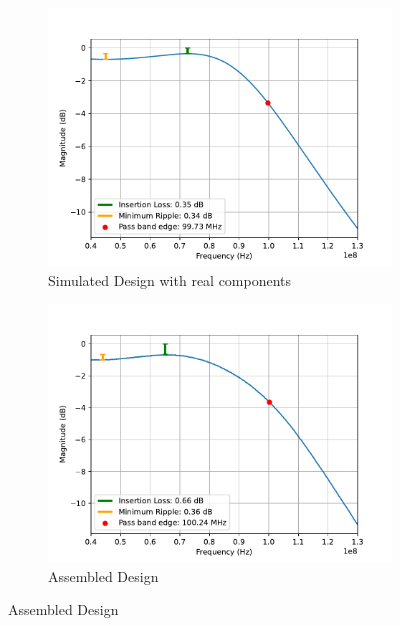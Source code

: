 \documentclass[letterpaper,12pt]{article}
\begin{document}
\begin{figure}[H]
    \begin{subfigure}[t]{.49\textwidth}
      \centering
      \includegraphics[width=\linewidth]{figures/4.real}
      \caption{Simulated Design with real components}
    \end{subfigure}
    \hfill
    \begin{subfigure}[t]{.49\textwidth}
      \centering
      \includegraphics[width=\linewidth]{figures/4.assembled}
      \caption{Assembled Design}
    \end{subfigure}
  \end{figure}

\newpage
\end{document}
